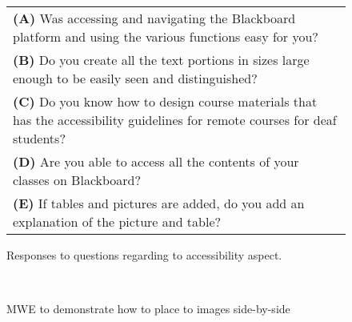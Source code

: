 \begin{figure*}[h!]
\begin{tabular}{p{}}
\textbf{(A)} Was accessing and navigating the Blackboard platform and using the various functions easy for you?\\
\textbf{(B)} Do you create all the text portions in sizes large enough to be easily seen and distinguished?\\
\textbf{(C)} Do you know how to design course materials that has the accessibility guidelines for remote courses for deaf students?\\
\textbf{(D)} Are you able to access all the contents of your classes on Blackboard?\\
\textbf{(E)} If tables and pictures are added, do you add an explanation of the picture and table?
\end{tabular}
 \caption{Responses to questions regarding to accessibility aspect.}
\label{fig:A11y_Questions}
\end{figure*}



\begin{figure}
\\

\caption{MWE to demonstrate how to place to images side-by-side}
\end{figure}